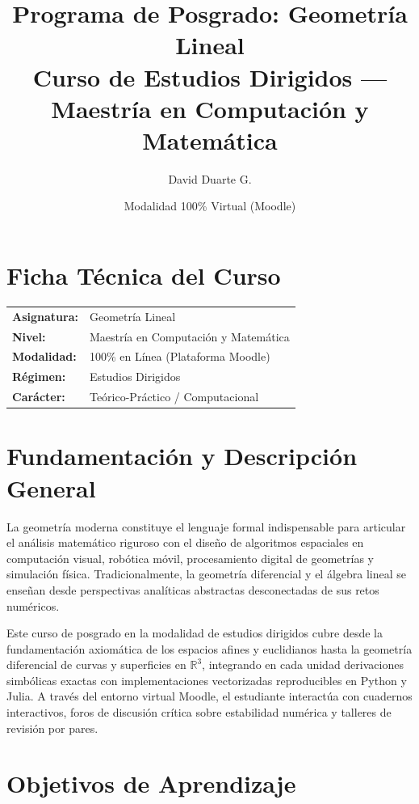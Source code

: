 \documentclass[11pt, a4paper]{article}
\title{\textbf{Programa de Posgrado: Geometría Lineal}\\ \large Curso de Estudios Dirigidos --- Maestría en Computación y Matemática}
\author{David Duarte G.}
\date{Modalidad 100\% Virtual (Moodle)}
\begin{document}
	
	\maketitle
	
	\section*{Ficha Técnica del Curso}
	
	\begin{center}
		\begin{tabularx}{\textwidth}{lX}
			\toprule
			\textbf{Asignatura:} & Geometría Lineal \\
			\textbf{Nivel:} & Maestría en Computación y Matemática \\
			\textbf{Modalidad:} & 100\% en Línea (Plataforma Moodle) \\
			\textbf{Régimen:} & Estudios Dirigidos \\
			\textbf{Carácter:} & Teórico-Práctico / Computacional \\
			
			\bottomrule
		\end{tabularx}
	\end{center}
	
	\section{Fundamentación y Descripción General}
	
	La geometría moderna constituye el lenguaje formal indispensable para articular el análisis matemático riguroso con el diseño de algoritmos espaciales en computación visual, robótica móvil, procesamiento digital de geometrías y simulación física. Tradicionalmente, la geometría diferencial y el álgebra lineal se enseñan desde perspectivas analíticas abstractas desconectadas de sus retos numéricos.
	
	Este curso de posgrado en la modalidad de estudios dirigidos cubre desde la fundamentación axiomática de los espacios afines y euclidianos hasta la geometría diferencial de curvas y superficies en $\mathbb{R}^3$, integrando en cada unidad derivaciones simbólicas exactas con implementaciones vectorizadas reproducibles en Python y Julia. A través del entorno virtual Moodle, el estudiante interactúa con cuadernos interactivos, foros de discusión crítica sobre estabilidad numérica y talleres de revisión por pares.
	
	\section{Objetivos de Aprendizaje}
	
\end{document}
